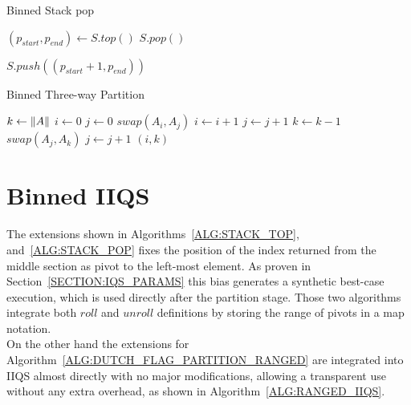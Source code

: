 \begin{algorithm}
    \caption{Binned Stack pop}\label{ALG:STACK_POP}
    \begin{algorithmic}[1]
        \State $(p_{start}, p_{end}) \gets S.top()$
        \State $S.pop()$
    
            \State $S.push((p_{start}+1, p_{end}))$
        \EndIf
        \EndProcedure
\end{algorithmic}
\end{algorithm}

\begin{algorithm}
\caption{Binned Three-way Partition}\label{ALG:DUTCH_FLAG_PARTITION_RANGED}
\begin{algorithmic}[1]
    \State $k \gets \lVert A\rVert$
    \State $i \gets 0$
    \State $j \gets 0$
            \State $swap(A_i, A_j)$
            \State $i \gets i+1$
            \State $j \gets j+1$
            \State $k \gets k-1$
            \State $swap(A_j, A_k)$
        \Else
            \State $j \gets j+1$
        \EndIf
    \EndWhile
    \State \Return $(i,k)$
    \EndProcedure
\end{algorithmic}
\end{algorithm}

\section{Binned IIQS}
The extensions shown in Algorithms~\ref{ALG:STACK_TOP}, and~\ref{ALG:STACK_POP} fixes the position of the index returned from the middle section as pivot to the left-most element. As proven in Section~\ref{SECTION:IQS_PARAMS} this bias generates a synthetic best-case execution, which is used directly after the partition stage. Those two algorithms integrate both $roll$ and $unroll$ definitions by storing the range of pivots in a map notation.\\


On the other hand the extensions for Algorithm~\ref{ALG:DUTCH_FLAG_PARTITION_RANGED} are integrated into IIQS almost directly with no major modifications, allowing a transparent use without any extra overhead, as shown in Algorithm~\ref{ALG:RANGED_IIQS}.\\


